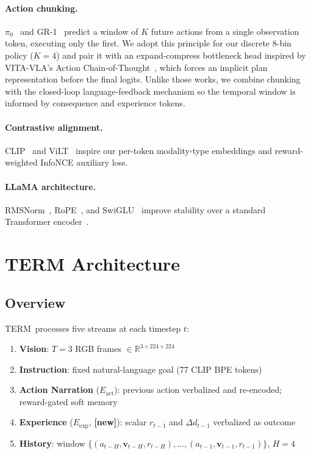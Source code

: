 \documentclass{article}
\newcommand{\modelname}{\textsc{TERM}\xspace}
\newcommand{\Lact}{$E_{\mathrm{act}}$\xspace}
\newcommand{\Lexp}{$E_{\mathrm{exp}}$\xspace}
\newcommand{\NEW}{\textcolor{NewOrange}{\textbf{[new]}}\xspace}
\begin{document}
\paragraph{Action chunking.}
$\pi_0$~\citep{black2024pi0} and GR-1~\citep{wu2023gr1} predict a window of $K$
future actions from a single observation token, executing only the first.
We adopt this principle for our discrete 8-bin policy ($K{=}4$) and pair it
with an expand-compress bottleneck head inspired by VITA-VLA's
Action Chain-of-Thought~\citep{vitavla2024}, which forces an implicit plan
representation before the final logits.
Unlike those works, we combine chunking with the closed-loop language-feedback
mechanism so the temporal window is informed by consequence and experience tokens.

\paragraph{Contrastive alignment.}
CLIP~\citep{radford2021clip} and ViLT~\citep{kim2021vilt} inspire our
per-token modality-type embeddings and reward-weighted InfoNCE auxiliary loss.

\paragraph{LLaMA architecture.}
RMSNorm~\citep{zhang2019rmsnorm}, RoPE~\citep{su2021rope}, and
SwiGLU~\citep{shazeer2020swiglu} improve stability over a standard
Transformer encoder~\citep{vaswani2017attention}.

\section{TERM Architecture}
\label{sec:model}

\subsection{Overview}

\modelname\ processes five streams at each timestep $t$:
\begin{enumerate}[leftmargin=1.5em,itemsep=1pt]
  \item \textbf{Vision}: $T{=}3$ RGB frames $\in\mathbb{R}^{3\times224\times224}$
  \item \textbf{Instruction}: fixed natural-language goal (77 CLIP BPE tokens)
  \item \textbf{Action Narration} (\Lact): previous action verbalized and
        re-encoded; reward-gated soft memory
  \item \textbf{Experience} (\Lexp, \NEW): scalar $r_{t-1}$ and
        $\Delta d_{t-1}$ verbalized as outcome
  \item \textbf{History}: window $\{(a_{t-H},\mathbf{v}_{t-H},r_{t-H}),
        \ldots,(a_{t-1},\mathbf{v}_{t-1},r_{t-1})\}$, $H{=}4$
\end{enumerate}
\end{document}
